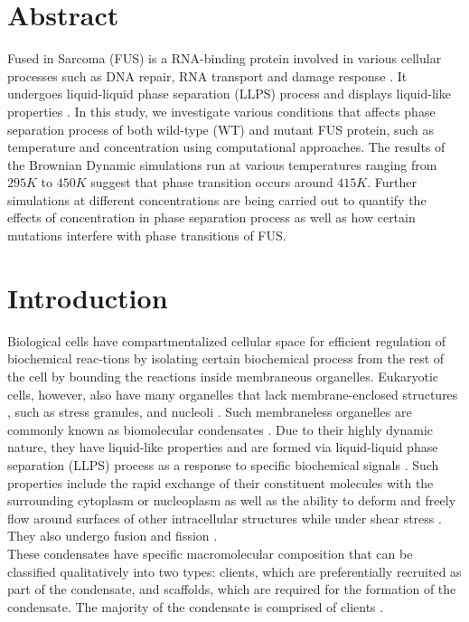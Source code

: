 \documentclass[12ptr]{article}
\begin{document}
\section{Abstract}
Fused in Sarcoma (FUS) is a RNA-binding protein involved in various cellular processes such as DNA repair, RNA transport and damage response \cite{Patel_15}. It undergoes liquid-liquid phase separation (LLPS) process and displays liquid-like properties \cite{Patel_15}. In this study, we investigate various conditions that affects phase separation process of both wild-type (WT) and mutant FUS protein, such as temperature and concentration using computational approaches. The results of the Brownian Dynamic simulations run at various temperatures ranging from $295K$ to $450K$ suggest that phase transition occurs around $415K$. Further simulations at different concentrations are being carried out to quantify the effects of concentration in phase separation process as well as how certain mutations interfere with phase transitions of FUS. 

\section{Introduction}

Biological cells have compartmentalized cellular space for efficient regulation of biochemical reac-tions by isolating certain biochemical process from the rest of the cell by bounding the reactions inside membraneous organelles. Eukaryotic cells, however, also have many organelles that lack membrane-enclosed structures \cite{Mullard_19}, such as stress granules, and nucleoli \cite{Mullard_19}. Such membraneless organelles are commonly known as biomolecular condensates \cite{Banani_17}. Due to their highly dynamic nature, they have liquid-like properties and are formed via liquid-liquid phase separation (LLPS) process as a response to specific biochemical signals \cite{Banani_17}. Such properties include the rapid exchange of their constituent molecules with the surrounding cytoplasm or nucleoplasm \cite{Mullard_19} as well as the ability to deform and freely flow around surfaces of other intracellular structures while under shear stress \cite{Banani_17}. They also undergo fusion and fission \cite{Patel_15, Mullard_19, Banani_17}.\\[0.01cm]

These condensates have specific macromolecular composition that can be classified qualitatively into two types: clients, which are preferentially recruited as part of the condensate, and scaffolds, which are required for the formation of the condensate. The majority of the condensate is comprised of clients \cite{Banani_17}.\\[0.01cm]
\end{document}
